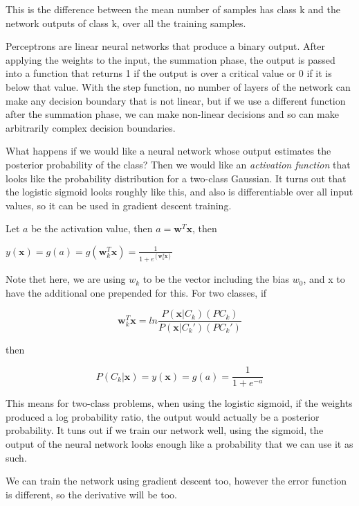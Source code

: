 \documentclass[10pt,a4paper]{article}
\newcommand{\re}[1]{\frac{1}{#1}}
\begin{document}
	This is the difference between the mean number of samples has class k and the network outputs of class k, over all the training samples.
	
	Perceptrons are linear neural networks that produce a binary output. After applying the weights to the input, the summation phase, the output is passed into a function that returns 1 if the output is over a critical value or 0 if it is below that value. With the step function, no number of layers of the network can make any decision boundary that is not linear, but if we use a different function after the summation phase, we can make non-linear decisions and so can make arbitrarily complex decision boundaries.
	
	What happens if we would like a neural network whose output estimates the posterior probability of the class? Then we would like an \textit{activation function} that looks like the probability distribution for a two-class Gaussian. It turns out that the logistic sigmoid looks roughly like this, and also is differentiable over all input values, so it can be used in gradient descent training.
	
	Let $a$ be the activation value, then $a = \bm w^T\bm x$, then 
	\begin{center}
		$
			y(\bm x) = g(a) = g(\bm w_k^T \bm x) = \frac{1}{1 + e^{(\bm w_k^T \bm x)}} 
		$
	\end{center}
	
	Note thet here, we are using $w_k$ to be the vector including the bias $w_0$, and x to have the additional one prepended for this. For two classes, if 
	
	\begin{equation*}
		\bm w_k^T \bm x = ln \frac{P(\bm x|C_k)(PC_k)}{P(\bm x|C_k')(PC_k')}
	\end{equation*}
	
	then 
	
	\begin{equation*}
		P(C_k|\bm x) = y(\bm x) = g(a) = \re{1 + e^{-a}}
	\end{equation*}
	
	This means for two-class problems, when using the logistic sigmoid, if the weights produced a log probability ratio, the output would actually be a posterior probability. It tuns out if we train our network well, using the sigmoid, the output of the neural network looks enough like a probability that we can use it as such. 
	
	We can train the network using gradient descent too, however the error function is different, so the derivative will be too.
	
\end{document}
